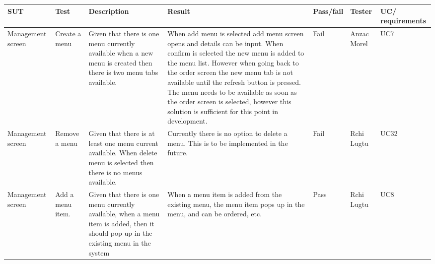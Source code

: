 \begin{tabularx}{\linewidth}{|X|X|X|X|X|X|X|}
\hline
SUT & Test & Description & Result & Pass/fail & Tester & UC/ requirements \\
\hline
Management screen & Create a menu & Given that there is one menu currently available when a new menu is created then there is two menu tabs available. & When add menu is selected add menu screen opens and details can be input. When confirm is selected the new menu is added to the menu list. However when going back to the order screen the new menu tab is not available until the refresh button is pressed. The menu needs to be available as soon as the order screen is selected, however this solution is sufficient for this point in development. & Fail & Anzac Morel & UC7 \\
\hline
Management screen & Remove a menu & Given that there is at least one menu current available. When delete menu is selected then there is no menus available. & Currently there is no option to delete a menu. This is to be implemented in the future. & Fail & Rchi Lugtu & UC32 \\
\hline
Management screen & Add a menu item. & Given that there is one menu currently available, when a menu item is added, then it should pop up in the existing menu in the system & When a menu item is added from the existing menu, the menu item pops up in the menu, and can be ordered, etc. & Pass & Rchi Lugtu & UC8 \\
\hline
\end{tabularx}
